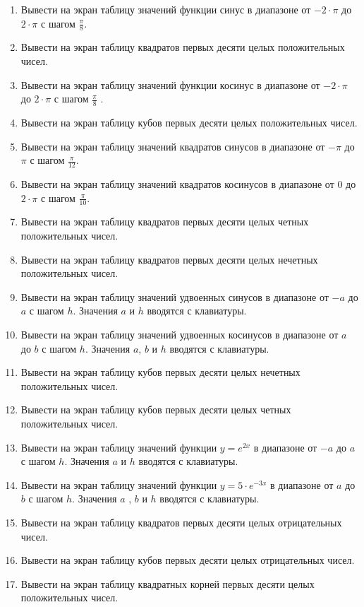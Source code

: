 \begin{enumerate}
\item Вывести на экран таблицу значений функции синус в диапазоне от  $-2\cdot \pi $ до  $2\cdot \pi $  с шагом 
$\frac{\pi}{8}$.
\item Вывести на экран таблицу квадратов первых десяти целых положительных чисел.
\item Вывести на экран таблицу значений функции косинус в диапазоне от  $-2\cdot \pi $  до  $2\cdot \pi $  с шагом 
$\frac{\pi}{8}$ .
\item Вывести на экран таблицу кубов первых десяти целых положительных чисел.
\item Вывести на экран таблицу значений квадратов синусов в диапазоне от  $-\pi$  до  $\pi$  с шагом $\frac{\pi}{12}$.
\item Вывести на экран таблицу значений квадратов косинусов в диапазоне от 0 до $2\cdot \pi$ с шагом $\frac{\pi}{10}$.
\item Вывести на экран таблицу квадратов первых десяти целых четных положительных чисел.
\item Вывести на экран таблицу квадратов первых десяти целых нечетных положительных чисел.
\item Вывести на экран таблицу значений удвоенных синусов в диапазоне от $-a$ до $a$ с шагом $h$. Значения $a$ и
 $h$  вводятся с клавиатуры.
\item Вывести на экран таблицу значений удвоенных косинусов в диапазоне от  $a$  до  $b$  с шагом  $h$. Значения  $a$,
 $b$  и  $h$  вводятся с клавиатуры.
\item Вывести на экран таблицу кубов первых десяти целых нечетных положительных чисел.
\item Вывести на экран таблицу кубов первых десяти целых четных положительных чисел.
\item Вывести на экран таблицу значений функции  $y=e^{2x}$ в диапазоне от  $-a$  до  $a$  с шагом  $h$. Значения  $a$ 
и  $h$  вводятся с клавиатуры.
\item Вывести на экран таблицу значений функции  $y=5\cdot e^{-3x}$  в диапазоне от  $a$  до  $b$  с шагом  $h$.
Значения  $a$ ,  $b$  и  $h$  вводятся с клавиатуры.
\item Вывести на экран таблицу квадратов первых десяти целых отрицательных чисел.
\item Вывести на экран таблицу кубов первых десяти целых отрицательных чисел.
\item Вывести на экран таблицу квадратных корней первых десяти целых положительных чисел.

\end{enumerate}
